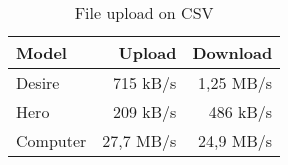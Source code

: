 \begin{table}
  \centering
  \caption{File upload on CSV}
  \begin{tabular}{ | l | r | r |}
    \hline
    \textbf{Model}    &   \textbf{Upload}  &   \textbf{Download}   \\ \hline
    Desire   &   715 kB/s & 1,25 MB/s   \\ \hline                
    Hero     &   209 kB/s & 486 kB/s    \\ \hline 
    Computer &  27,7 MB/s & 24,9 MB/s \\ \hline
  \end{tabular}
  \label{tbl:files:encrypted}
\end{table}
